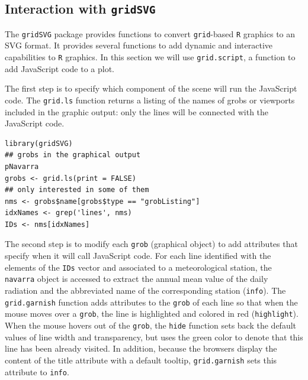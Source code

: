 \subsection{\floweroneleft Interaction with \texttt{gridSVG}}
\label{sec:orgf4dee19}
The \texttt{gridSVG} package provides functions to convert \texttt{grid}-based \texttt{R}
graphics to an SVG format. It provides several functions to add
dynamic and interactive capabilities to \texttt{R} graphics. In this section
we will use \texttt{grid.script}, a function to add JavaScript code to a
plot.

The first step is to specify which component of the scene
will run the JavaScript code. The \texttt{grid.ls} function  returns a
listing of the names of grobs or viewports included in the graphic
output: only the lines will be connected with the JavaScript
code. 


\lstset{language=r,label= ,caption= ,captionpos=b,numbers=none}
\begin{lstlisting}
library(gridSVG)
## grobs in the graphical output
pNavarra
grobs <- grid.ls(print = FALSE)
## only interested in some of them
nms <- grobs$name[grobs$type == "grobListing"]
idxNames <- grep('lines', nms)
IDs <- nms[idxNames]
\end{lstlisting}

The second step is to modify each \texttt{grob} (graphical object) to add
attributes that specify when it will call JavaScript code. For each
line identified with the elements of the \texttt{IDs} vector and associated
to a meteorological station, the \texttt{navarra} object is accessed to
extract the annual mean value of the daily radiation and the
abbreviated name of the corresponding station (\texttt{info}).  The
\texttt{grid.garnish} function adds attributes to the \texttt{grob} of each line so
that when the mouse moves over a \texttt{grob}, the line is highlighted and
colored in red (\texttt{highlight}). When the mouse hovers out of the \texttt{grob},
the \texttt{hide} function sets back the default values of line width and
transparency, but uses the green color to denote that this line has
been already visited. In addition, because the browsers display the
content of the title attribute with a default tooltip, \texttt{grid.garnish}
sets this attribute to \texttt{info}.


